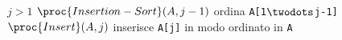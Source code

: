 \begin{codebox}
\li \If $j > 1$
\li     \Then
		$\proc{Insertion-Sort}(A,j-1)$
        \Comment ordina \texttt{A[1$\twodots$j-1]}
\li         $\proc{Insert}(A,j)$
        \Comment inserisce \texttt{A[j]} in modo ordinato in \texttt{A}
        \End
\end{codebox}